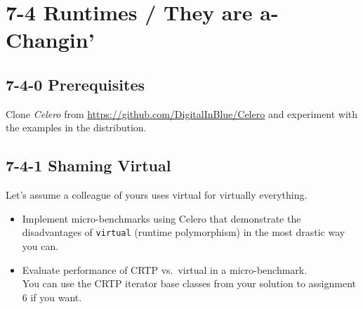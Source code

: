 \documentclass[]{article}
\begin{document}
\section{7-4 Runtimes / They are
a-Changin'}\label{runtimes-they-are-a-changin}

\subsection{7-4-0 Prerequisites}\label{prerequisites}

Clone \emph{Celero} from \url{https://github.com/DigitalInBlue/Celero}
and experiment with the examples in the distribution.

\subsection{7-4-1 Shaming Virtual}\label{shaming-virtual}

Let's assume a colleague of yours uses virtual for virtually everything.

\begin{itemize}
\item
  Implement micro-benchmarks using Celero that demonstrate the
  disadvantages of \texttt{virtual} (runtime polymorphism) in the most
  drastic way you can.
\item
  Evaluate performance of CRTP vs.~virtual in a micro-benchmark.\\
   You can use the CRTP iterator base classes from your solution to
  assignment 6 if you want.
\end{itemize}
\end{document}
